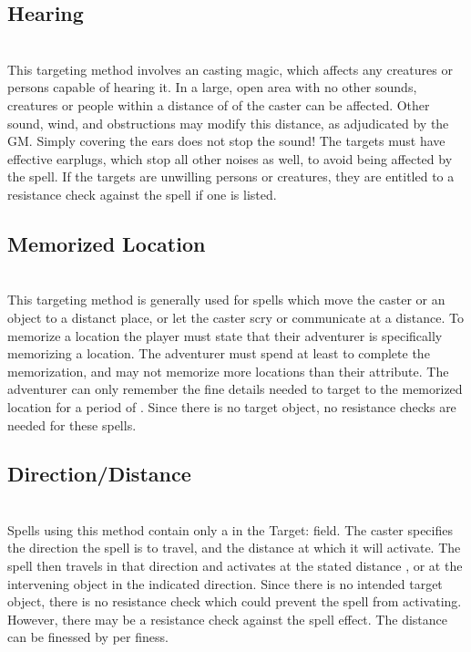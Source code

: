 \begin{multicols*}{2}
\subsection{Hearing}
\\
This targeting method involves an  casting magic, which affects any creatures or persons capable of hearing it. In a large, open area with no other sounds,  creatures or people within a distance of  of the caster can be affected. Other sound, wind, and obstructions may modify this distance, as adjudicated by the GM. Simply covering the ears does not stop the sound! The targets must have effective earplugs, which stop all other noises as well, to avoid being affected by the spell. If the targets are unwilling persons or creatures, they are entitled to a resistance check against the spell if one is listed.
\subsection{Memorized Location}
\\
This targeting method is generally used for spells which move the caster or an object to a distanct place, or let the caster scry or communicate at a distance. To memorize a location the player must state that their adventurer is specifically memorizing a location. The adventurer must spend at least  to complete the memorization, and may not memorize more locations than their \INT attribute. The adventurer can only remember the fine details needed to target to the memorized location for a period of . Since there is no target object, no resistance checks are needed for these spells.
\subsection{Direction/Distance}
\\
Spells using this method contain only a  in the Target: field. The caster specifies the direction the spell is to travel, and the distance at which it will activate. The spell then travels in that direction and activates at the stated distance , or at the  intervening object in the indicated direction. Since there is no intended target object, there is no resistance check which could prevent the spell from activating. However, there may be a resistance check against the spell effect. The distance can be finessed by  per finess.

\end{multicols*}
